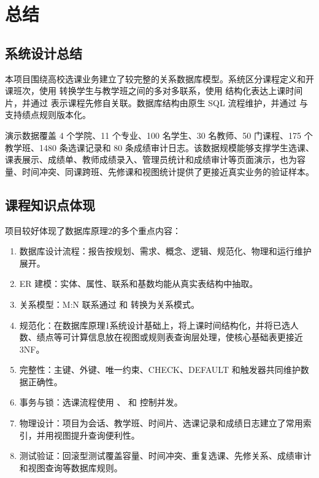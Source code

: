 \chapter{总结}

\section{系统设计总结}

本项目围绕高校选课业务建立了较完整的关系数据库模型。系统区分课程定义和开课班次，使用  转换学生与教学班之间的多对多联系，使用  结构化表达上课时间片，并通过  表示课程先修自关联。数据库结构由原生 SQL 流程维护，并通过  与  支持绩点规则版本化。

演示数据覆盖 4 个学院、11 个专业、100 名学生、30 名教师、50 门课程、175 个教学班、1480 条选课记录和 80 条成绩审计日志。该数据规模能够支撑学生选课、课表展示、成绩单、教师成绩录入、管理员统计和成绩审计等页面演示，也为容量、时间冲突、同课跨班、先修课和视图统计提供了更接近真实业务的验证样本。

\section{课程知识点体现}

项目较好体现了数据库原理2的多个重点内容：

\begin{enumerate}
  \item 数据库设计流程：报告按规划、需求、概念、逻辑、规范化、物理和运行维护展开。
  \item ER 建模：实体、属性、联系和基数均能从真实表结构中抽取。
  \item 关系模型：M:N 联系通过  和  转换为关系模式。
  \item 规范化：在数据库原理1系统设计基础上，将上课时间结构化，并将已选人数、绩点等可计算信息放在视图或规则表查询层处理，使核心基础表更接近 3NF。
  \item 完整性：主键、外键、唯一约束、CHECK、DEFAULT 和触发器共同维护数据正确性。
  \item 事务与锁：选课流程使用 、 和  控制并发。
  \item 物理设计：项目为会话、教学班、时间片、选课记录和成绩日志建立了常用索引，并用视图提升查询便利性。
  \item 测试验证：回滚型测试覆盖容量、时间冲突、重复选课、先修关系、成绩审计和视图查询等数据库规则。
\end{enumerate}

